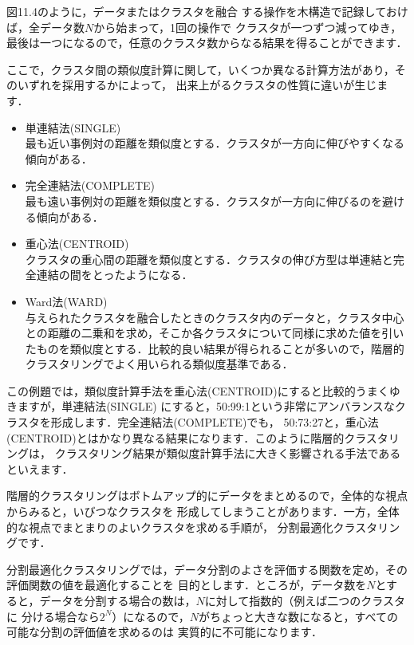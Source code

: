 
図11.4のように，データまたはクラスタを融合
する操作を木構造で記録しておけば，全データ数$N$から始まって，1回の操作で
クラスタが一つずつ減ってゆき，最後は一つになるので，任意のクラスタ数からなる結果を得ることができます．


ここで，クラスタ間の類似度計算に関して，いくつか異なる計算方法があり，そのいずれを採用するかによって，
出来上がるクラスタの性質に違いが生じます．

\begin{itemize}
\item 単連結法(SINGLE)\\
最も近い事例対の距離を類似度とする．クラスタが一方向に伸びやすくなる傾向がある．
\item 完全連結法(COMPLETE)\\
最も遠い事例対の距離を類似度とする．クラスタが一方向に伸びるのを避ける傾向がある．
\item 重心法(CENTROID)\\
クラスタの重心間の距離を類似度とする．クラスタの伸び方型は単連結と完全連結の間をとったようになる．
\item Ward法(WARD)\\
与えられたクラスタを融合したときのクラスタ内のデータと，クラスタ中心との距離の二乗和を求め，そこか各クラスタについて同様に求めた値を引いたものを類似度とする．比較的良い結果が得られることが多いので，階層的クラスタリングでよく用いられる類似度基準である．
\end{itemize}


この例題では，類似度計算手法を重心法(CENTROID)にすると比較的うまくゆきますが，単連結法(SINGLE)
にすると，50:99:1という非常にアンバランスなクラスタを形成します．完全連結法(COMPLETE)でも，
50:73:27と，重心法(CENTROID)とはかなり異なる結果になります．このように階層的クラスタリングは，
クラスタリング結果が類似度計算手法に大きく影響される手法であるといえます．


階層的クラスタリングはボトムアップ的にデータをまとめるので，全体的な視点からみると，いびつなクラスタを
形成してしまうことがあります．一方，全体的な視点でまとまりのよいクラスタを求める手順が，
分割最適化クラスタリングです．

分割最適化クラスタリングでは，データ分割のよさを評価する関数を定め，その評価関数の値を最適化することを
目的とします．ところが，データ数を$N$とすると，データを分割する場合の数は，$N$に対して指数的（例えば二つのクラスタに
分ける場合なら$2^N$）になるので，$N$がちょっと大きな数になると，すべての可能な分割の評価値を求めるのは
実質的に不可能になります．


